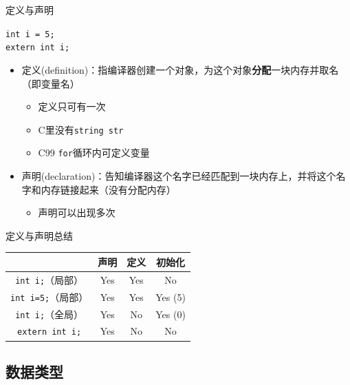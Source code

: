 \documentclass{myslide}
\begin{document}
\begin{frame}[fragile]{定义与声明}
\begin{center}
\Large\verb'int i = 5;'\\
\verb'extern int i;'
\end{center}
\pause
\begin{itemize}
	\item 定义(definition)：指编译器创建一个对象，为这个对象\textbf{分配}一块内存并取名（即变量名）
	\begin{itemize}
		\item 定义只可有一次
		\item C里没有\verb'string str'
		\item C99 \verb'for'循环内可定义变量
	\end{itemize}
	\item 声明(declaration)：告知编译器这个名字已经匹配到一块内存上，并将这个名字和内存链接起来（没有分配内存）
	\begin{itemize}
		\item 声明可以出现多次
	\end{itemize}
\end{itemize}
\end{frame}

\begin{frame}[fragile]{定义与声明总结\protect\footnotemark}
\begin{center}
\begin{tabular}{|c|c|c|c|}\hline
 & 声明 & 定义 & 初始化\\\hline 
\verb'int i;'（局部）  &  Yes      &     Yes  &        No\\\hline
\verb'int i=5;'（局部）&  Yes      &     Yes  &       Yes (5)\\\hline
\verb'int i;'（全局）  &  Yes      &      No  &       Yes (0)\\\hline
\verb'extern int i;'  &  Yes      &      No  &        No\\\hline
\end{tabular}
\end{center}
\end{frame}

\subsection{数据类型}
\begin{frame}
\subsectionpage
\end{frame}
\end{document}
